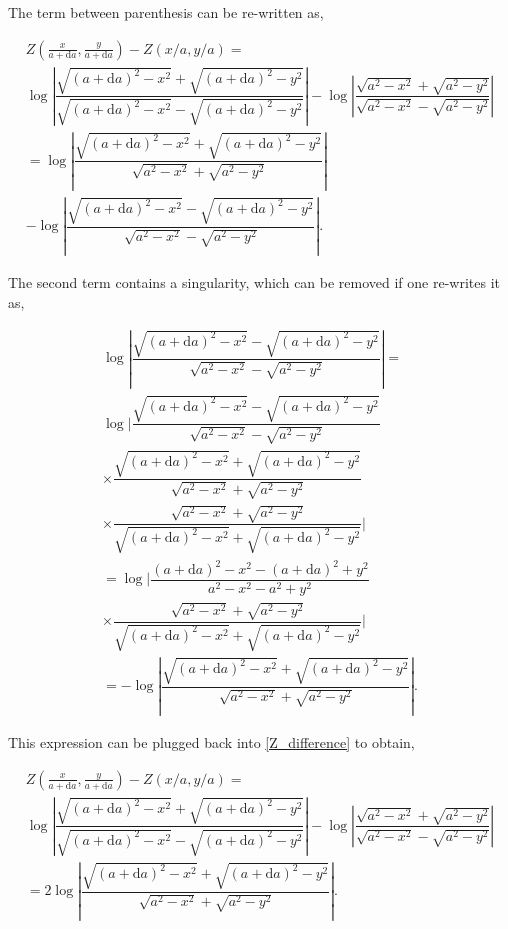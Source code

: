 \noindent The term between parenthesis can be re-written as,

\begin{multline}\label{Z_difference}
    Z(\frac{x}{a+\text{d}a}, \frac{y}{a+\text{d}a}) - Z(x/a, y/a) = \\ \log\left|\dfrac{\sqrt{(a+\text{d}a)^2-x^2}+\sqrt{(a+\text{d}a)^2-y^2}}{\sqrt{(a+\text{d}a)^2-x^2}-\sqrt{(a+\text{d}a)^2-y^2}}\right| - 
    \log\left|\dfrac{\sqrt{a^2-x^2}+\sqrt{a^2-y^2}}{\sqrt{a^2-x^2}-\sqrt{a^2-y^2}}\right|\\
    = \log\left|\dfrac{\sqrt{(a+\text{d}a)^2-x^2}+\sqrt{(a+\text{d}a)^2-y^2}}{\sqrt{a^2-x^2}+\sqrt{a^2-y^2}}\right| \\ - 
    \log\left|\dfrac{\sqrt{(a+\text{d}a)^2-x^2}-\sqrt{(a+\text{d}a)^2-y^2}}{\sqrt{a^2-x^2}-\sqrt{a^2-y^2}}\right|.
\end{multline}

\noindent The second term contains a singularity, which can be removed if one re-writes it as,

\begin{multline}
    \log\left|\dfrac{\sqrt{(a+\text{d}a)^2-x^2}-\sqrt{(a+\text{d}a)^2-y^2}}{\sqrt{a^2-x^2}-\sqrt{a^2-y^2}}\right| = \\
    \log\biggl|\dfrac{\sqrt{(a+\text{d}a)^2-x^2}-\sqrt{(a+\text{d}a)^2-y^2}}{\sqrt{a^2-x^2}-\sqrt{a^2-y^2}} \\ \times \dfrac{\sqrt{(a+\text{d}a)^2-x^2}+\sqrt{(a+\text{d}a)^2-y^2}}{\sqrt{a^2-x^2}+\sqrt{a^2-y^2}} \\ \times \dfrac{\sqrt{a^2-x^2}+\sqrt{a^2-y^2}}{\sqrt{(a+\text{d}a)^2-x^2}+\sqrt{(a+\text{d}a)^2-y^2}} \biggr| \\
    = \log\biggl|\dfrac{(a+\text{d}a)^2-x^2-(a+\text{d}a)^2+y^2}{a^2-x^2-a^2+y^2}  \\ \times \dfrac{\sqrt{a^2-x^2}+\sqrt{a^2-y^2}}{\sqrt{(a+\text{d}a)^2-x^2}+\sqrt{(a+\text{d}a)^2-y^2}} \biggr|\\
    = - \log\left|\dfrac{\sqrt{(a+\text{d}a)^2-x^2}+\sqrt{(a+\text{d}a)^2-y^2}}{\sqrt{a^2-x^2}+\sqrt{a^2-y^2}} \right|.
\end{multline}

\noindent This expression can be plugged back into \eqref{Z_difference} to obtain,

\begin{multline}
    Z(\frac{x}{a+\text{d}a}, \frac{y}{a+\text{d}a}) - Z(x/a, y/a) = \\ \log\left|\dfrac{\sqrt{(a+\text{d}a)^2-x^2}+\sqrt{(a+\text{d}a)^2-y^2}}{\sqrt{(a+\text{d}a)^2-x^2}-\sqrt{(a+\text{d}a)^2-y^2}}\right| - 
    \log\left|\dfrac{\sqrt{a^2-x^2}+\sqrt{a^2-y^2}}{\sqrt{a^2-x^2}-\sqrt{a^2-y^2}}\right|\\
    = 2\log\left|\dfrac{\sqrt{(a+\text{d}a)^2-x^2}+\sqrt{(a+\text{d}a)^2-y^2}}{\sqrt{a^2-x^2}+\sqrt{a^2-y^2}}\right|.
\end{multline}

